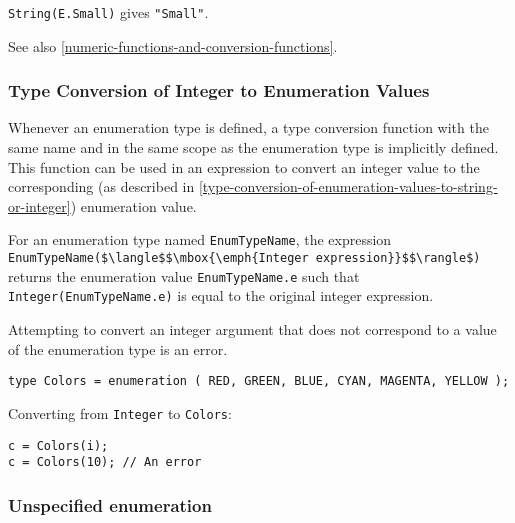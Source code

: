 \begin{example}
\lstinline!String(E.Small)! gives \lstinline!"Small"!.
\end{example}

See also \cref{numeric-functions-and-conversion-functions}.

\subsubsection{Type Conversion of Integer to Enumeration Values}\label{type-conversion-of-integer-to-enumeration-values}

Whenever an enumeration type is defined, a type conversion function with
the same name and in the same scope as the enumeration type is
implicitly defined. This function can be used in an expression to
convert an integer value to the corresponding (as described in \cref{type-conversion-of-enumeration-values-to-string-or-integer}) enumeration value.

For an enumeration type named \lstinline!EnumTypeName!, the expression \lstinline!EnumTypeName($\langle$$\mbox{\emph{Integer expression}}$$\rangle$)! returns the enumeration value \lstinline!EnumTypeName.e! such that \lstinline!Integer(EnumTypeName.e)! is equal to the original integer expression.

Attempting to convert an integer argument that does not correspond to a
value of the enumeration type is an error.

\begin{example}
\begin{lstlisting}[language=modelica]
type Colors = enumeration ( RED, GREEN, BLUE, CYAN, MAGENTA, YELLOW );
\end{lstlisting}

Converting from \lstinline!Integer! to \lstinline!Colors!:
\begin{lstlisting}[language=modelica]
c = Colors(i);
c = Colors(10); // An error
\end{lstlisting}
\end{example}


\subsubsection{Unspecified enumeration}\label{unspecified-enumeration}

